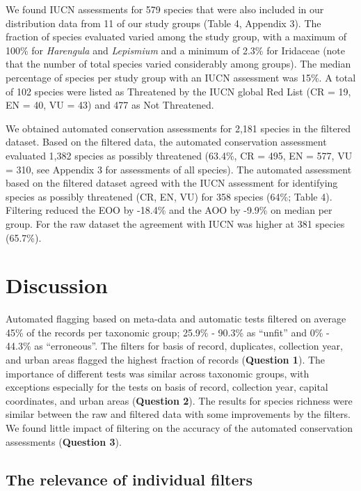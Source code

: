 \documentclass[fleqn,10pt,lineno]{wlpeerj} %
\begin{document}
We found IUCN assessments for 579 species that were also included in our distribution data from 11 of our study groups (Table 4, Appendix 3). The fraction of species evaluated varied among the study group, with a maximum of 100\% for \emph{Harengula} and \emph{Lepismium} and a minimum of 2.3\% for Iridaceae (note that the number of total species varied considerably among groups). The median percentage of species per study group with an IUCN assessment was 15\%. A total of 102 species were listed as Threatened by the IUCN global Red List (CR = 19, EN = 40, VU = 43) and 477 as Not Threatened.

We obtained automated conservation assessments for 2,181 species in the filtered dataset. Based on the filtered data, the automated conservation assessment evaluated 1,382 species as possibly threatened (63.4\%, CR = 495, EN = 577, VU = 310, see Appendix 3 for assessments of all species). The automated assessment based on the filtered dataset agreed with the IUCN assessment for identifying species as possibly threatened (CR, EN, VU) for 358 species (64\%; Table 4). Filtering reduced the EOO by -18.4\% and the AOO by -9.9\% on median per group. For the raw dataset the agreement with IUCN was higher at 381 species (65.7\%).

\hypertarget{discussion}{%
\section*{Discussion}\label{discussion}}

Automated flagging based on meta-data and automatic tests filtered on average 45\% of the records per taxonomic group; 25.9\% - 90.3\% as ``unfit'' and 0\% - 44.3\% as ``erroneous''. The filters for basis of record, duplicates, collection year, and urban areas flagged the highest fraction of records (\textbf{Question 1}). The importance of different tests was similar across taxonomic groups, with exceptions especially for the tests on basis of record, collection year, capital coordinates, and urban areas (\textbf{Question 2}). The results for species richness were similar between the raw and filtered data with some improvements by the filters. We found little impact of filtering on the accuracy of the automated conservation assessments (\textbf{Question 3}).

\hypertarget{the-relevance-of-individual-filters}{%
\subsection*{The relevance of individual filters}\label{the-relevance-of-individual-filters}}
\end{document}

